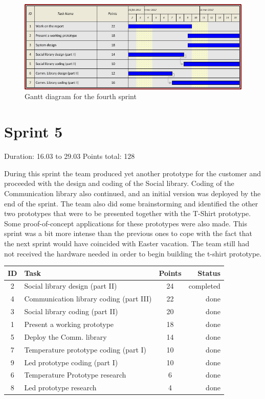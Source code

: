 \begin{figure}[h!]
\centering \includegraphics[scale=0.8]{img/sprints-gantt4.png}
\caption{Gantt diagram for the fourth sprint}
\label{fig:sprints-gantt4}
\end{figure}

\newpage

\section{Sprint 5}

Duration: 16.03 to 29.03
Points total: 128

During this sprint the team produced yet another prototype for the customer
and proceeded with the design and coding of the Social library.
Coding of the Communication library also continued, and an initial version
was deployed by the end of the sprint. The team also did some brainstorming
and identified the other two prototypes that were to be presented together with
the T-Shirt prototype. Some proof-of-concept applications for these
prototypes were also made. This sprint was a bit more intense than the previous
ones to cope with the fact that the next sprint would have coincided with Easter vacation.
The team still had not received the hardware needed in order to begin building the t-shirt
prototype.

\begin{table}[ht!]
\begin{tabular}{ | c | l | c | r | }

\hline
\textbf{ID} & \textbf{Task} & \textbf{Points} & \textbf{Status} \\
\hline

 2 & Social library design (part II)			& 24 & completed \\
\hline
 4 & Communication library coding (part III)	& 22 & done \\
\hline
 3 & Social library coding (part II)			& 20 & done \\
\hline
 1 & Present a working prototype				& 18 & done \\
\hline
 5 & Deploy the Comm. library					& 14 & done \\
\hline
 7 & Temperature prototype coding (part I)		& 10 & done \\
\hline
 9 & Led prototype coding (part I)				& 10 & done \\
\hline
 6 & Temperature Prototype research				& 6  & done \\
\hline
 8 & Led prototype research						& 4  & done \\
\hline


\end{tabular}
\end{table}


